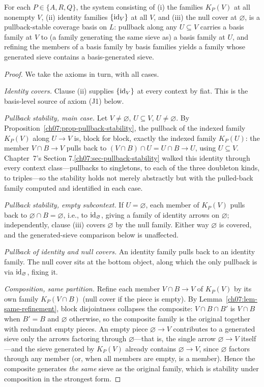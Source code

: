 \begin{lemma}\label{ch09:lem-basis}
For each $P\in\{A,R,Q\}$, the system consisting of (i) the families $K_{P}(V)$ at all nonempty $V$, (ii) identity families $\{\mathrm{id}_{V}\}$ at all $V$, and (iii) the null cover at $\varnothing$, is a pullback-stable coverage basis on $L$: pullback along any $U\subseteq V$ carries a basis family at $V$ to (a family generating the same sieve as) a basis family at $U$, and refining the members of a basis family by basis families yields a family whose generated sieve contains a basis-generated sieve.
\end{lemma}

\begin{proof}
We take the axioms in turn, with all cases.

\emph{Identity covers.} Clause (ii) supplies $\{\mathrm{id}_{V}\}$ at every context by fiat. This is the basis-level source of axiom (J1) below.

\emph{Pullback stability, main case.} Let $V\neq\varnothing$, $U\subseteq V$, $U\neq\varnothing$. By Proposition~\ref{ch07:prop-pullback-stability}, the pullback of the indexed family $K_{P}(V)$ along $U\to V$ is, block for block, exactly the indexed family $K_{P}(U)$: the member $V\cap B\to V$ pulls back to $(V\cap B)\cap U=U\cap B\to U$, using $U\subseteq V$. Chapter~7's Section 7.\ref{ch07:sec-pullback-stability} walked this identity through every context class---pullbacks to singletons, to each of the three doubleton kinds, to triples---so the stability holds not merely abstractly but with the pulled-back family computed and identified in each case.

\emph{Pullback stability, empty subcontext.} If $U=\varnothing$, each member of $K_{P}(V)$ pulls back to $\varnothing\cap B=\varnothing$, i.e., to $\mathrm{id}_{\varnothing}$, giving a family of identity arrows on $\varnothing$; independently, clause (iii) covers $\varnothing$ by the null family. Either way $\varnothing$ is covered, and the generated-sieve comparison below is unaffected.

\emph{Pullback of identity and null covers.} An identity family pulls back to an identity family. The null cover sits at the bottom object, along which the only pullback is via $\mathrm{id}_{\varnothing}$, fixing it.

\emph{Composition, same partition.} Refine each member $V\cap B\to V$ of $K_{P}(V)$ by its own family $K_{P}(V\cap B)$ (null cover if the piece is empty). By Lemma~\ref{ch07:lem-same-refinement}, block disjointness collapses the composite: $V\cap B\cap B'$ is $V\cap B$ when $B'=B$ and $\varnothing$ otherwise, so the composite family is the original together with redundant empty pieces. An empty piece $\varnothing\to V$ contributes to a generated sieve only the arrows factoring through $\varnothing$---that is, the single arrow $\varnothing\to V$ itself---and the sieve generated by $K_{P}(V)$ already contains $\varnothing\to V$, since $\varnothing$ factors through any member (or, when all members are empty, is a member). Hence the composite generates \emph{the same} sieve as the original family, which is stability under composition in the strongest form.


\end{proof}
